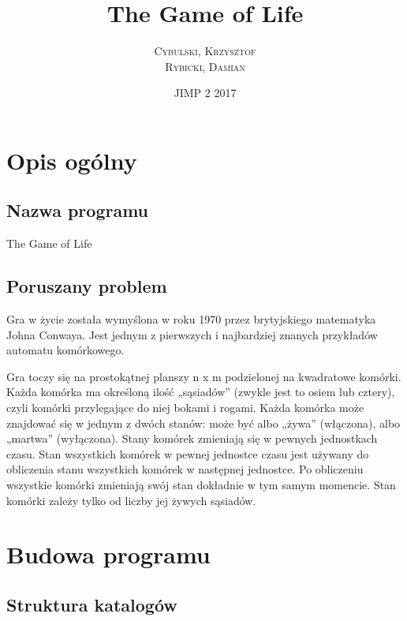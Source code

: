 \documentclass{article}
\begin{document}
\pagestyle{fancy}
\cfoot{}

\begin{titlepage}
\title{The Game of Life}
\author{\textsc{Cybulski, Krzysztof}\\
        \textsc{Rybicki, Damian}}
\date{JIMP 2 2017}
\maketitle
\end{titlepage}

\tableofcontents
\newpage


\section{Opis ogólny}
\subsection{Nazwa programu}

The Game of Life

\subsection{Poruszany problem}

Gra w życie została wymyślona w roku 1970 przez brytyjskiego matematyka Johna Conwaya. Jest jednym z pierwszych i najbardziej znanych przykładów automatu komórkowego.

Gra toczy się na prostokątnej planszy n x m podzielonej na kwadratowe komórki. Każda komórka ma określoną ilość „sąsiadów” (zwykle jest to osiem lub cztery), czyli komórki przylegające do niej bokami i rogami. Każda komórka może znajdować się w jednym z dwóch stanów: może być albo „żywa” (włączona), albo „martwa” (wyłączona). Stany komórek zmieniają się w pewnych jednostkach czasu. Stan wszystkich komórek w pewnej jednostce czasu jest używany do obliczenia stanu wszystkich komórek w następnej jednostce. Po obliczeniu wszystkie komórki zmieniają swój stan dokładnie w tym samym momencie. Stan komórki zależy tylko od liczby jej żywych sąsiadów.

\section{Budowa programu}
\subsection{Struktura katalogów}
\end{document}
